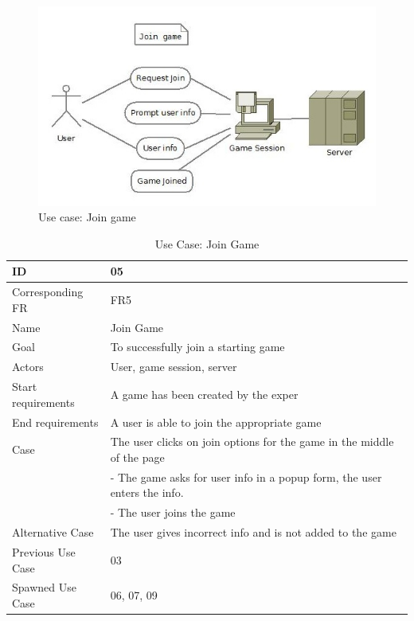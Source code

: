 \begin{figure}[H]
  \centering
    \includegraphics[width=1.0\textwidth]{img/joingame.jpg}
  \caption{Use case: Join game} 
  \label{fig:joingame}
\end{figure}


\begin{table}[H]
\begin{tabular}{|l|p{14cm}|}
\hline
	\textbf{ID} & \textbf{05}\\ \hline
	Corresponding FR & FR5\\ \hline
	Name & Join Game\\ \hline
	Goal & To successfully join a starting game\\ \hline
	Actors & User, game session, server \\ \hline
	Start requirements & A game has been created by the exper\\ \hline
	End requirements & A user is able to join the appropriate game\\ \hline
	Case & The user clicks on join options for the game in the middle of the page\\
			& - The game asks for user info in a popup form, the user enters the info. \\
			& - The user joins the game \\ \hline
	Alternative Case & The user gives incorrect info and is not added to the game \\ \hline
	Previous Use Case & 03 \\ \hline
	Spawned Use Case & 06, 07, 09\\ \hline
\end{tabular}
\caption{Use Case: Join Game}
\label{fig:usecase05table}
\end{table}


